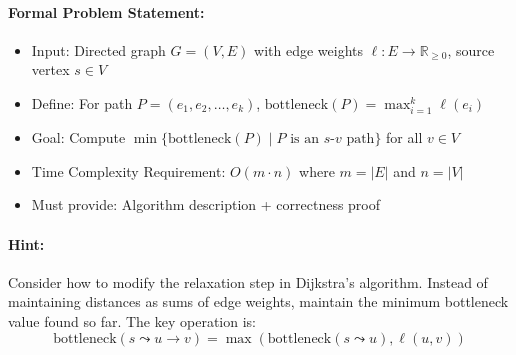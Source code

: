 \documentclass[12pt,a4paper]{article}
\theoremstyle{plain}
\theoremstyle{definition}
\theoremstyle{remark}
\begin{document}
\paragraph{Formal Problem Statement:}
\begin{itemize}
    \item Input: Directed graph $G = (V, E)$ with edge weights $\ell: E \to \mathbb{R}_{\geq 0}$, source vertex $s \in V$
    \item Define: For path $P = (e_1, e_2, \ldots, e_k)$, $\text{bottleneck}(P) = \max_{i=1}^{k} \ell(e_i)$
    \item Goal: Compute $\min\{\text{bottleneck}(P) \mid P \text{ is an } s\text{-}v \text{ path}\}$ for all $v \in V$
    \item Time Complexity Requirement: $O(m \cdot n)$ where $m = |E|$ and $n = |V|$
    \item Must provide: Algorithm description + correctness proof
\end{itemize}

\paragraph{Hint:}
Consider how to modify the relaxation step in Dijkstra's algorithm. Instead of maintaining distances as sums of edge weights, maintain the minimum bottleneck value found so far. The key operation is:
\[
\text{bottleneck}(s \leadsto u \to v) = \max(\text{bottleneck}(s \leadsto u), \ell(u,v))
\]
\end{document}
